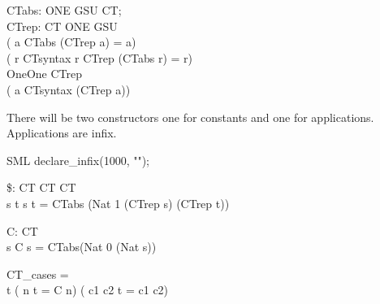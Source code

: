 \begin{HOLConst}
\+\PrNM{} \PrNL{}CTabs\PrNN{}: ONE GSU \MMM{\rightarrow} CT;\\
\+\PrNM{} \PrNL{}CTrep\PrNN{}: CT \MMM{\rightarrow} ONE GSU\\
\PrPH{}\PrPM{}\PrPM{}\PrPM{}\PrPM{}\PrPM{}\PrPM{}\PrPM{}\PrPM{}\PrPM{}\PrPM{}\PrPM{}
\+\PrNM{}	(\MMM{\forall} a\MMM{\bullet} CTabs (CTrep a) = a)\\
\+\PrNM{}     \MMM{\land} (\MMM{\forall} r\MMM{\bullet} CTsyntax r \MMM{\Leftrightarrow} CTrep (CTabs r) = r)\\
\+\PrNM{}     \MMM{\land} OneOne CTrep\\
\+\PrNM{}     \MMM{\land} (\MMM{\forall} a\MMM{\bullet} CTsyntax (CTrep a))\\
\end{HOLConst}


There will be two constructors one for constants and one for applications.
Applications are infix.

\begin{GFT}{SML}
\+declare\_infix(1000, "");\\
\end{GFT}

\begin{HOLConst}
\+\PrNM{} \PrNL{}\$\PrNN{}: CT \MMM{\rightarrow} CT \MMM{\rightarrow} CT\\
\PrPH{}\PrPM{}\PrPM{}\PrPM{}\PrPM{}\PrPM{}\PrPM{}\PrPM{}\PrPM{}\PrPM{}\PrPM{}\PrPM{}
\+\PrNM{} \MMM{\forall}s t\MMM{\bullet} s  t = CTabs (Nat 1 \MMM{\mapsto} (CTrep s) \MMM{\mapsto} (CTrep t))\\
\end{HOLConst}

\begin{HOLConst}
\+\PrNM{} \PrNL{}C\PrNN{}: \PrOO{} \MMM{\rightarrow} CT\\
\PrPH{}\PrPM{}\PrPM{}\PrPM{}\PrPM{}\PrPM{}\PrPM{}\PrPM{}\PrPM{}\PrPM{}\PrPM{}\PrPM{}
\+\PrNM{} \MMM{\forall}s\MMM{\bullet} C s = CTabs(Nat 0 \MMM{\mapsto} (Nat s))\\
\end{HOLConst}

\begin{GFT}{}
\+\PrNL{}CT\_cases\PrNN{} =\\
\+	\MMM{\Zthm} \MMM{\forall} t\MMM{\bullet} (\MMM{\exists} n\MMM{\bullet} t = C n) \MMM{\lor} (\MMM{\exists} c1 c2\MMM{\bullet} t = c1  c2)\\
\end{GFT}


